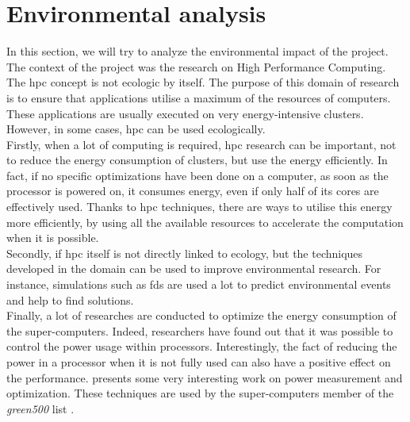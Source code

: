 
\clearpage{}
\section{Environmental analysis}

In this section, we will try to analyze the environmental impact of the
project.\\

The context of the project was the research on High Performance Computing. The
\gls{hpc} concept is not ecologic by itself. The purpose of this domain of
research is to ensure that applications utilise a maximum of the resources of
computers. These applications are usually executed on very energy-intensive
clusters. However, in some cases, \gls{hpc} can be used ecologically.\\

Firstly, when a lot of computing is required, \gls{hpc} research can be
important, not to reduce the energy consumption of clusters, but use the energy
efficiently. In fact, if no specific optimizations have been done on a computer,
as soon as the processor is powered on, it consumes energy, even if only half of
its cores are effectively used. Thanks to \gls{hpc} techniques, there are ways
to utilise this energy more efficiently, by using all the available resources to
accelerate the computation when it is possible.\\

Secondly, if \gls{hpc} itself is not directly linked to ecology, but the
techniques developed in the domain can be used to improve environmental
research. For instance, simulations such as \gls{fds} are used a lot to predict
environmental events and help to find solutions.\\

Finally, a lot of researches are conducted to optimize the energy consumption of
the super-computers. Indeed, researchers have found out that it was possible to
control the power usage within processors. Interestingly, the fact of reducing
the power in a processor when it is not fully used can also have a positive
effect on the performance. \cite{song2009energy} presents some very interesting
work on power measurement and optimization. These techniques are used by the
super-computers member of the \textit{green500} list \cite{enwiki:1230059074}.
